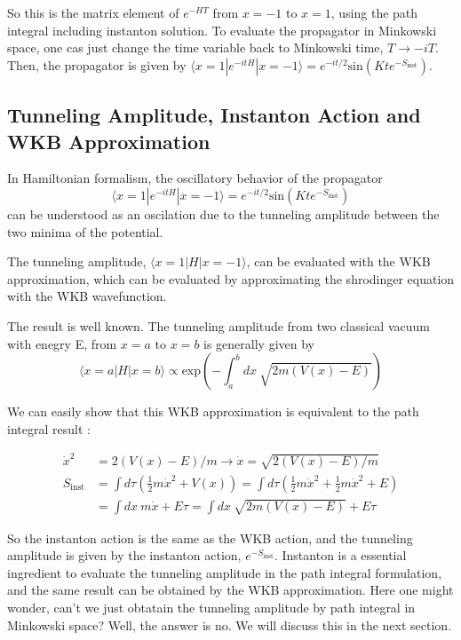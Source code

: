 \documentclass{article}
\begin{document}
So this is the matrix element of $e^{-HT}$ from $x = -1$ to $x = 1$, using the path integral including instanton solution. 
To evaluate the propagator in Minkowski space, one cas just change the time variable back to Minkowski time, $T \rightarrow -iT$.
Then, the propagator is given by $\langle x = 1 | e^{-itH} | x = -1 \rangle = e^{-it/2}  \text{sin}(Kt e^{-S_{\text{inst}}})$.

\subsection{Tunneling Amplitude, Instanton Action and WKB Approximation}

In Hamiltonian formalism, the oscillatory behavior of the propagator
\begin{equation}
    \langle x = 1 | e^{-itH} | x = -1 \rangle = e^{-it/2}  \text{sin}(Kt e^{-S_{\text{inst}}})
\end{equation}
can be understood as an oscilation due to the tunneling amplitude between the two minima of the potential.


The tunneling amplitude, $\langle x=1 | H | x=-1 \rangle $, can be evaluated with the WKB approximation, which can be evaluated by approximating the shrodinger equation with the WKB wavefunction.

The result is well known. The tunneling amplitude from two classical vacuum with enegry E, from $x = a$ to $x = b$ is generally given by
\begin{equation}
    \langle x = a | H | x = b \rangle \propto \text{exp}\left( -\int_a^b  dx \ \sqrt{2m(V(x)-E)} \right)
\end{equation}

We can easily show that this WKB approximation is equivalent to the path integral result :
    
\begin{align}
    \dot{x}^2&=2(V(x)-E)/m \rightarrow \dot{x} = \sqrt{2(V(x)-E)/m} \\
    S_{\text{inst}} &= \int d\tau \left( \frac{1}{2} m \dot{x}^2 + V(x) \right) = \int d\tau \left( \frac{1}{2} m \dot{x}^2 + \frac{1}{2} m \dot{x}^2 + E   \right) \\
    &= \int dx \ m\dot{x} + E\tau = \int dx \ \sqrt{2m(V(x)-E)} + E\tau 
\end{align}

So the instanton action is the same as the WKB action, and the tunneling amplitude is given by the instanton action, $e^{-S_{\text{inst}}}$.
Instanton is a essential ingredient to evaluate the tunneling amplitude in the path integral formulation, and the same result can be obtained by the WKB approximation.
Here one might wonder, can't we just obtatain the tunneling amplitude by path integral in Minkowski space? Well, the answer is no. We will discuss this in the next section.
\end{document}
